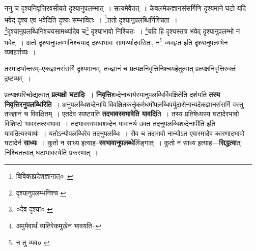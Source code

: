 \documentclass[article,12pt,a4paper]{memoir}
\begin{document}
	  \pstart ननु च दृश्यनिवृत्तिरवसीयते दृश्यानुपलम्भात् । सत्यमेवैतत् । केवलमेकज्ञानसंसर्गिणि दृश्यमाने घटो यदि भवेद् दृश्य एव भवेदिति दृश्यः सम्भावितः । \footnote{विविक्तप्रदेशज्ञानात्०--\cite{dp-msD-n}}ततो दृश्यानुपलब्धिर्निश्चिता । \footnote{दृश्यानुपलम्भनिश्च \cite{dp-msC} \cite{dp-msD}}दृश्यानुपलब्धिनिश्चयसामर्थ्यादेव च\footnote{०देव दृश्या० \cite{dp-edE}} दृश्याभावो निश्चितः । \footnote{अमुमेवार्थं व्यतिरेकमुखेन भावयति--\cite{dp-msD-n}}यदि हि दृश्यस्तत्र भवेद् दृश्यानुपलम्भो न भवेत् । अतो दृश्यानुपलम्भनिश्चयाद् दश्याभावः सामर्थ्यादवसितः, न\footnote{न तु व्यव० \cite{dp-msA} \cite{dp-edP} \cite{dp-edH} \cite{dp-edE} \cite{dp-edN}} व्यवहृत इति दृश्यानुपलम्भेन व्यवहर्त्तव्यः ।
	\pend
       

	  \pstart तस्मादर्थान्तरम्--एकज्ञानसंसर्गि दृश्यमानम्, तज्ज्ञानं च प्रत्यक्षनिवृत्तिनिश्चयहेतुत्वात् प्रत्यक्षनिवृत्तिरुक्तं द्रष्टव्यम् ।
	\pend
      
	  \endgroup
	

	  \pstart प्रत्यक्षपरिच्छेद्यत्वात् \textbf{प्रत्यक्षो घटादिः । निवृत्ति}शब्देनाचार्यस्यानुपलब्धिर्विवक्षितेति दर्शयति \textbf{तस्य निवृत्तिरनुपलब्धिरिति} । अनुपलब्धिशब्देनापि विवक्षितकर्त्तृकर्मधर्मोपलब्धिपर्युदासेनान्यदेकज्ञानसंसर्गि वस्तु तज्ज्ञानं च विवक्षितम् । \leavevmode{}एतदेव स्पष्टयति \textbf{तदभावस्वभावेति यावदि}ति । तस्य प्रतिषेध्यस्य घटादेरभावो विशिष्टो भावस्तत्स्वभावा । तदभावस्वभावशब्देन यावानर्थ उक्त तदनुपलब्धिशब्देनापीति इति यावदित्यस्यार्थः । यतोऽन्योपलब्धिरेव तदनुपलब्धिः । सैव च तदभावो नान्योऽत एवास्मादेव कारणादभावो घटादेर्न \textbf{साध्यः} । कुतो न साध्य इत्याह--\textbf{स्वभावानुपलब्धे}र्लिङ्गात् । कुतो न साध्य इत्याह—\textbf{सिद्धत्वा}त् निश्चितत्वात् घटाभावस्येति प्रकरणात् ।
	\pend
      
\end{document}
